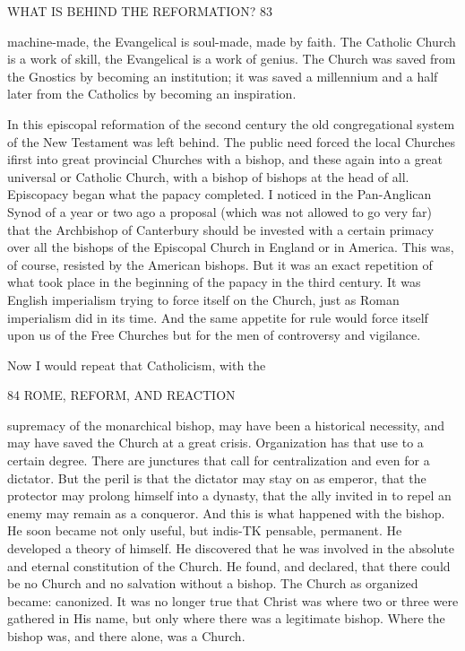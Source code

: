 \documentclass[12pt,a5paper,oneside]{book}
\begin{document}
WHAT IS BEHIND THE REFORMATION? 83 

machine-made, the Evangelical is soul-made, made by 
faith. The Catholic Church is a work of skill, the 
Evangelical is a work of genius. The Church was 
saved from the Gnostics by becoming an institution; 
it was saved a millennium and a half later from the 
Catholics by becoming an inspiration. 

In this episcopal reformation of the second century 
the old congregational system of the New Testament 
was left behind. The public need forced the local 
Churches ifirst into great provincial Churches with 
a bishop, and these again into a great universal or 
Catholic Church, with a bishop of bishops at the head 
of all. Episcopacy began what the papacy completed. 
I noticed in the Pan-Anglican Synod of a year or two 
ago a proposal (which was not allowed to go very far) 
that the Archbishop of Canterbury should be invested 
with a certain primacy over all the bishops of the 
Episcopal Church in England or in America. This 
was, of course, resisted by the American bishops. 
But it was an exact repetition of what took place in 
the beginning of the papacy in the third century. It 
was English imperialism trying to force itself on the 
Church, just as Roman imperialism did in its time. 
And the same appetite for rule would force itself 
upon us of the Free Churches but for the men of 
controversy and vigilance. 

Now I would repeat that Catholicism, with the 



84 ROME, REFORM, AND REACTION 

supremacy of the monarchical bishop, may have been a 
historical necessity, and may have saved the Church 
at a great crisis. Organization has that use to a 
certain degree. There are junctures that call for 
centralization and even for a dictator. But the peril 
is that the dictator may stay on as emperor, that the 
protector may prolong himself into a dynasty, that 
the ally invited in to repel an enemy may remain as 
a conqueror. And this is what happened with the 
bishop. He soon became not only useful, but indis-TK
pensable, permanent. He developed a theory of 
himself. He discovered that he was involved in the 
absolute and eternal constitution of the Church. He 
found, and declared, that there could be no Church 
and no salvation without a bishop. The Church as 
organized became: canonized. It was no longer true 
that Christ was where two or three were gathered in 
His name, but only where there was a legitimate 
bishop. Where the bishop was, and there alone, was 
a Church. 
\end{document}
